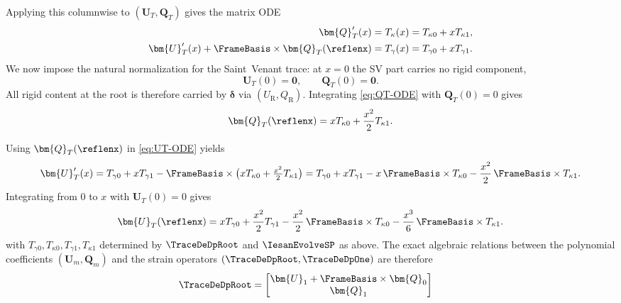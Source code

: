 \begin{Aside}
Applying this columnwise to $(\bm{U}_T,\bm{Q}_T)$ gives the matrix ODE
\begin{align}
  \bm{Q}_T'(x) &= T_\kappa(x) = T_{\kappa 0}+xT_{\kappa 1}, \label{eq:QT-ODE}\\
  \bm{U}_T'(x) + \FrameBasis\times\bm{Q}_T(\reflenx) &= T_\gamma(x) = T_{\gamma 0}+xT_{\gamma 1}. \label{eq:UT-ODE}
\end{align}
We now impose the natural normalization for the Saint~Venant trace: at $x=0$ the SV part carries no rigid component,
\[
  \bm{U}_T(0) = \mathbf{0},
  \qquad
  \bm{Q}_T(0) = \mathbf{0}.
\]
All rigid content at the root is therefore carried by $\bm{\delta}$ via $(U_{\mathrm{R}},Q_{\mathrm{R}})$. 
Integrating \eqref{eq:QT-ODE} with $\bm{Q}_T(0)=0$ gives
\[
\bm{Q}_T(\reflenx)
  = x T_{\kappa 0} + \frac{x^2}{2}T_{\kappa 1}.
\]

Using $\bm{Q}_T(\reflenx)$ in \eqref{eq:UT-ODE} yields
\[
  \bm{U}_T'(x)
  = T_{\gamma 0} + xT_{\gamma 1}
    - \FrameBasis\times\bigl(x T_{\kappa 0} + \tfrac{x^2}{2}T_{\kappa 1}\bigr)
  = T_{\gamma 0} + xT_{\gamma 1}
    - x\,\FrameBasis\times T_{\kappa 0}
    - \frac{x^2}{2}\,\FrameBasis\times T_{\kappa 1}.
\]
Integrating from $0$ to $x$ with $\bm{U}_T(0)=0$ gives
\[
  \bm{U}_T(\reflenx)
  = x T_{\gamma 0}
    + \frac{x^2}{2}T_{\gamma 1}
    - \frac{x^2}{2}\,\FrameBasis\times T_{\kappa 0}
    - \frac{x^3}{6}\,\FrameBasis\times T_{\kappa 1}.
\]
with $T_{\gamma 0},T_{\kappa 0},T_{\gamma 1},T_{\kappa 1}$ determined by $\TraceDeDpRoot$ and $\IesanEvolveSP$ as above.
The exact algebraic relations between the polynomial coefficients $(\bm{U}_m,\bm{Q}_m)$ and the strain operators $(\TraceDeDpRoot,\TraceDeDpOne)$ are therefore
\[
  \begin{aligned}
    \TraceDeDpRoot &=
    \begin{bmatrix}
      \bm{U}_1 + \FrameBasis\times \bm{Q}_0 \\ \bm{Q}_1

\end{bmatrix}
\end{aligned}\]
\end{Aside}
